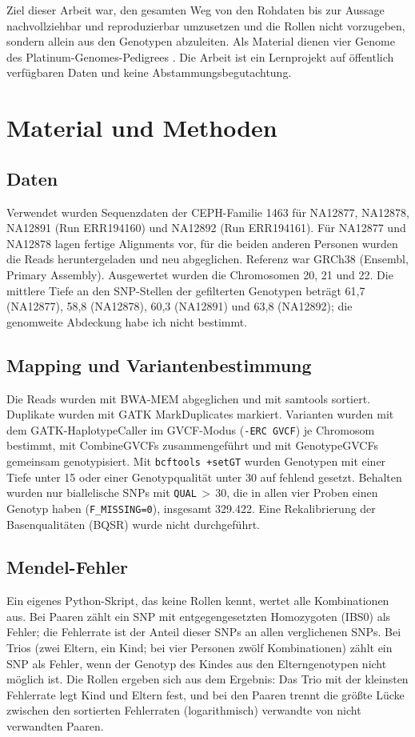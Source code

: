 \documentclass[10pt,a4paper,twocolumn]{article}
\begin{document}
Ziel dieser Arbeit war, den gesamten Weg von den Rohdaten bis zur Aussage nachvollziehbar und reproduzierbar umzusetzen und die Rollen nicht vorzugeben, sondern allein aus den Genotypen abzuleiten. Als Material dienen vier Genome des Platinum-Genomes-Pedigrees \citep{eberle2017}. Die Arbeit ist ein Lernprojekt auf öffentlich verfügbaren Daten und keine Abstammungsbegutachtung.

\section{Material und Methoden}
\subsection{Daten}
Verwendet wurden Sequenzdaten der CEPH-Familie 1463 \citep{eberle2017} für NA12877, NA12878, NA12891 (Run ERR194160) und NA12892 (Run ERR194161). Für NA12877 und NA12878 lagen fertige Alignments vor, für die beiden anderen Personen wurden die Reads heruntergeladen und neu abgeglichen. Referenz war GRCh38 (Ensembl, Primary Assembly). Ausgewertet wurden die Chromosomen 20, 21 und 22. Die mittlere Tiefe an den SNP-Stellen der gefilterten Genotypen beträgt 61,7 (NA12877), 58,8 (NA12878), 60,3 (NA12891) und 63,8 (NA12892); die genomweite Abdeckung habe ich nicht bestimmt.

\subsection{Mapping und Variantenbestimmung}
Die Reads wurden mit BWA-MEM \citep{li2013} abgeglichen und mit samtools sortiert. Duplikate wurden mit GATK MarkDuplicates markiert. Varianten wurden mit dem GATK-HaplotypeCaller im GVCF-Modus (\texttt{-ERC GVCF}) je Chromosom bestimmt, mit CombineGVCFs zusammengeführt und mit GenotypeGVCFs gemeinsam genotypisiert. Mit \texttt{bcftools +setGT} wurden Genotypen mit einer Tiefe unter 15 oder einer Genotypqualität unter 30 auf fehlend gesetzt. Behalten wurden nur biallelische SNPs mit \texttt{QUAL}\,$>$\,30, die in allen vier Proben einen Genotyp haben (\texttt{F\_MISSING=0}), insgesamt 329.422. Eine Rekalibrierung der Basenqualitäten (BQSR) wurde nicht durchgeführt.

\subsection{Mendel-Fehler}
Ein eigenes Python-Skript, das keine Rollen kennt, wertet alle Kombinationen aus. Bei Paaren zählt ein SNP mit entgegengesetzten Homozygoten (IBS0) als Fehler; die Fehlerrate ist der Anteil dieser SNPs an allen verglichenen SNPs. Bei Trios (zwei Eltern, ein Kind; bei vier Personen zwölf Kombinationen) zählt ein SNP als Fehler, wenn der Genotyp des Kindes aus den Elterngenotypen nicht möglich ist. Die Rollen ergeben sich aus dem Ergebnis: Das Trio mit der kleinsten Fehlerrate legt Kind und Eltern fest, und bei den Paaren trennt die größte Lücke zwischen den sortierten Fehlerraten (logarithmisch) verwandte von nicht verwandten Paaren.
\end{document}

